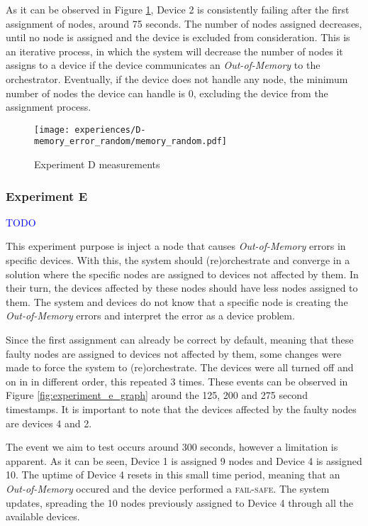As it can be observed in Figure \ref{fig:experiment_d_graph}, Device 2 is consistently failing after the first assignment of nodes, around 75 seconds. The number of nodes assigned decreases, until no node is assigned and the device is excluded from consideration. This is an iterative process, in which the system will decrease the number of nodes it assigns to a device if the device communicates an \textit{Out-of-Memory} to the orchestrator. Eventually, if the device does not handle any node, the minimum number of nodes the device can handle is 0, excluding the device from the assignment process.

\begin{figure}[h]
\centering
\texttt{[image: experiences/D-memory\_error\_random/memory\_random.pdf]}
\caption[Experiment D measurements]{Experiment D measurements}\label{fig:experiment_d_graph}
\end{figure}


\subsubsection{Experiment E}

\textcolor{blue}{TODO}

This experiment purpose is inject a node that causes \textit{Out-of-Memory} errors in specific devices. With this, the system should (re)orchestrate and converge in a solution where the specific nodes are assigned to devices not affected by them. In their turn, the devices affected by these nodes should have less nodes assigned to them. The system and devices do not know that a specific node is creating the \textit{Out-of-Memory} errors and interpret the error as a device problem.

Since the first assignment can already be correct by default, meaning that these faulty nodes are assigned to devices not affected by them, some changes were made to force the system to (re)orchestrate. The devices were all turned off and on in in different order, this repeated 3 times. These events can be observed in Figure \ref{fig:experiment_e_graph} around the 125, 200 and 275 second timestamps. It is important to note that the devices affected by the faulty nodes are devices 4 and 2.

The event we aim to test occurs around 300 seconds, however a limitation is apparent. As it can be seen, Device 1 is assigned 9 nodes and Device 4 is assigned 10. The uptime of Device 4 resets in this small time period, meaning that an \textit{Out-of-Memory} occured and the device performed a \textsc{fail-safe}. The system updates, spreading the 10 nodes previously assigned to Device 4 through all the available devices. 

